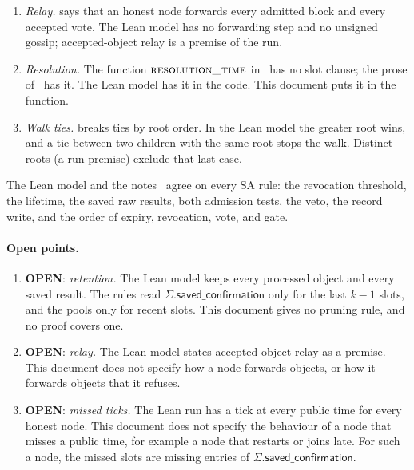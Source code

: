 \documentclass{article}
\theoremstyle{plain}
\theoremstyle{definition}
\theoremstyle{remark}
\newcommand{\savedConfirmation}{\mathsf{saved\_confirmation}}
\newcommand{\DC}[1]{\cite[\S#1]{DC}}
\newcommand{\OPEN}{\textbf{OPEN}}
\begin{document}
\begin{enumerate}[leftmargin=*]
  the proposer and the parent slot.  In the Lean model, well-formedness
  is a premise on delivered objects, and the block handler checks the
  proposer key and the parent slot.  This document puts both checks in
  $\Call{on\_block}{}$ and states well-formedness as a property of the
  wire object.
\item \emph{Relay.}  \cite{DC} says that an honest node forwards every
  admitted block and every accepted vote.  The Lean model has no
  forwarding step and no unsigned gossip; accepted-object relay is a
  premise of the run.
\item \emph{Resolution.}  The function $\Call{resolution\_time}{}$
  in~\DC{7} has no slot clause; the prose of~\DC{2.2} has it.  The Lean
  model has it in the code.  This document puts it in the function.
\item \emph{Walk ties.}  \cite{DC} breaks ties by root order.  In the
  Lean model the greater root wins, and a tie between two children with
  the same root stops the walk.  Distinct roots (a run premise) exclude
  that last case.
\end{enumerate}

The Lean model and the notes~\cite{SA,RT} agree on every SA rule:
the revocation threshold, the lifetime, the saved raw results, both
admission tests, the veto, the record write, and the order of expiry,
revocation, vote, and gate.

\paragraph{Open points.}
\begin{enumerate}[leftmargin=*]
\item \OPEN: \emph{retention.}  The Lean model keeps every processed
  object and every saved result.  The rules read $\Sigma.\savedConfirmation$ only
  for the last $k-1$ slots, and the pools only for recent slots.  This
  document gives no pruning rule, and no proof covers one.
\item \OPEN: \emph{relay.}  The Lean model states accepted-object relay
  as a premise.  This document does not specify how a node forwards
  objects, or how it forwards objects that it refuses.
\item \OPEN: \emph{missed ticks.}  The Lean run has a tick at every
  public time for every honest node.  This document does not specify the
  behaviour of a node that misses a public time, for example a node that
  restarts or joins late.  For such a node, the missed slots are missing
  entries of $\Sigma.\savedConfirmation$.
\end{enumerate}
\end{document}
